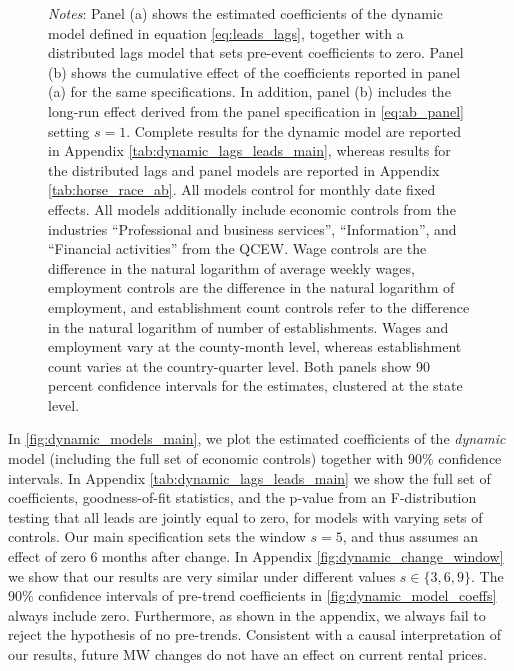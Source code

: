 \begin{figure}[htb!]
\begin{minipage}{0.95\textwidth}
		\vspace{2mm} 
		\textit{Notes}: Panel (a) shows the estimated coefficients of the dynamic model defined 
		in equation \autoref{eq:leads_lags}, together with a distributed lags model that sets 
		pre-event coefficients to zero. Panel (b) shows the cumulative effect of the coefficients 
		reported in panel (a) for the same specifications. In addition, panel (b) includes the 
		long-run effect derived from the panel specification in \autoref{eq:ab_panel} setting $s=1$. Complete 
		results for the dynamic model are reported in Appendix 
		\autoref{tab:dynamic_lags_leads_main}, whereas results for the distributed lags and panel 
		models are reported in Appendix \autoref{tab:horse_race_ab}. All models control for 
		monthly date fixed effects. All models additionally  include economic controls from the 
		industries ``Professional and business services'', ``Information'', and ``Financial 
		activities'' from the QCEW. Wage controls are the difference in the natural logarithm of 
		average weekly wages, employment controls are the difference in the natural logarithm of 
		employment, and establishment count controls refer to the difference in the natural 
		logarithm of number of establishments. Wages and employment vary at the county-month 
		level, whereas establishment count varies at the country-quarter level. Both panels
		show 90 percent confidence intervals for the estimates, clustered at the state level. 
	\end{minipage}
\end{figure}


In \autoref{fig:dynamic_models_main}, we plot the estimated coefficients of the \textit{dynamic} 
model (including the full set of economic controls) together with 90\% confidence intervals. In
Appendix \autoref{tab:dynamic_lags_leads_main} we show the full set of coefficients, 
goodness-of-fit statistics, and the p-value from an F-distribution testing that all leads are 
jointly equal to zero, for models with varying sets of controls. Our main specification sets the 
window $s = 5$, and thus assumes an effect of zero 6 months after change. In Appendix 
\autoref{fig:dynamic_change_window} we show that our results are very similar under different 
values $s \in \{3, 6, 9\}$. The 90\% confidence intervals of pre-trend coefficients in 
\autoref{fig:dynamic_model_coeffs} always include zero. Furthermore, as shown in the appendix, 
we always fail to reject the hypothesis of no pre-trends. Consistent with a causal interpretation 
of our results, future MW changes do not have an effect on current rental prices. 

